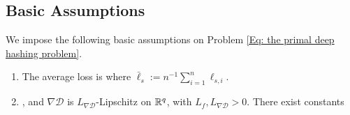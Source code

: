 \subsection{Basic Assumptions}
We impose the following basic assumptions on Problem \eqref{Eq: the primal deep hashing problem}.
\begin{assumption}
\label{Ass: basic regularity}
\leavevmode
\begin{enumerate}[label=\textup{(\roman*)},leftmargin=2em]
    \item The average loss is  where \(\bar{\ell}_s:=n^{-1}\sum_{i=1}^{n}\ell_{s,i}\).
    \item {}, and $\nabla\mathcal{D}$ is $L_{\nabla\mathcal{D}}$-Lipschitz on $\mathbb{R}^q$, with $L_f,L_{\nabla\mathcal{D}}>0$. There exist constants 
\end{enumerate}
\end{assumption}


